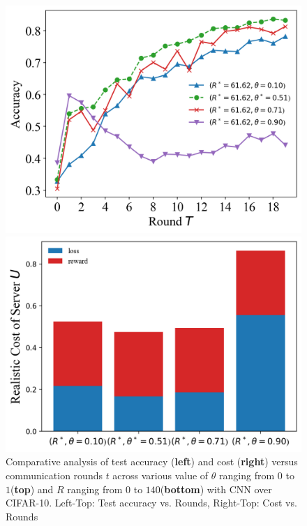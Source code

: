 \documentclass{article}
\theoremstyle{plain}
\theoremstyle{definition}
\theoremstyle{remark}
\begin{document}
\begin{figure}
\begin{minipage}{0.49\linewidth}
		\centerline{\includegraphics[width=\textwidth]{figures/figure_65_B.png}}
	\end{minipage}
	\begin{minipage}{0.49\linewidth}
		\centerline{\includegraphics[width=\textwidth]{figures/figure_66_B.png}}
	\end{minipage}
	\caption{Comparative analysis of test accuracy (\textbf{left}) and cost (\textbf{right}) versus communication rounds $t$ across various value of $\theta$ ranging from $0$ to $1$(\textbf{top}) and $R$ ranging from $0$ to $140$(\textbf{bottom}) with CNN over CIFAR-10. Left-Top: Test accuracy vs. Rounds, Right-Top: Cost vs. Rounds}
  \label{fig:server_staleness}
\end{figure}
\end{document}
